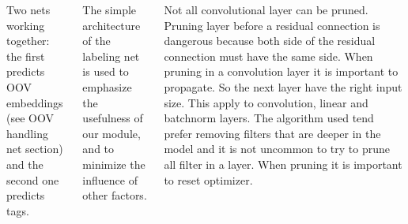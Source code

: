 \documentclass[25pt, a0paper,
               colspace=15mm, subcolspace=0mm,
               blockverticalspace=17mm,
               landscape]{tikzposter} %
\begin{document}
\begin{columns}
{  Two nets working together: the first predicts OOV embeddings (see OOV handling net section) and the second one predicts tags.

  The simple architecture of the labeling net is used to emphasize the usefulness of our module, and to minimize the influence of other factors.

  \vspace{-.5mm}

  }









  {
   Not all convolutional layer can be pruned. Pruning layer before a residual connection is dangerous because both side of the residual connection must have the same side.
  \newline
  When pruning in a convolution layer it is important to propagate. So the next layer have the right input size. This apply to convolution, linear and batchnorm layers.
  \newline
  The algorithm used tend prefer removing filters that are deeper in the model and it is not uncommon to try to prune all filter in a layer.
  \newline
  When pruning it is important to reset optimizer.
  \newline
  }







  
  
  
  

\end{columns}
\end{document}

